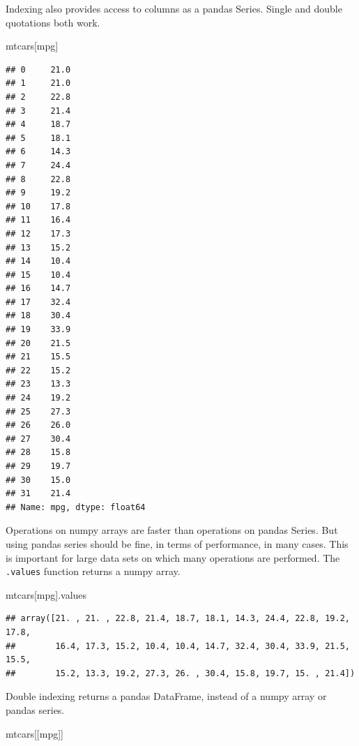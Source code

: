 \documentclass[
]{book}
\newenvironment{Shaded}{\begin{snugshade}}{\end{snugshade}}
\newcommand{\NormalTok}[1]{#1}
\newcommand{\StringTok}[1]{\textcolor[rgb]{0.31,0.60,0.02}{#1}}
\begin{document}
Indexing also provides access to columns as a pandas Series. Single and double quotations both work.

\begin{Shaded}
\begin{Highlighting}[]
\NormalTok{mtcars[}\StringTok{\textquotesingle{}mpg\textquotesingle{}}\NormalTok{]}
\end{Highlighting}
\end{Shaded}

\begin{verbatim}
## 0     21.0
## 1     21.0
## 2     22.8
## 3     21.4
## 4     18.7
## 5     18.1
## 6     14.3
## 7     24.4
## 8     22.8
## 9     19.2
## 10    17.8
## 11    16.4
## 12    17.3
## 13    15.2
## 14    10.4
## 15    10.4
## 16    14.7
## 17    32.4
## 18    30.4
## 19    33.9
## 20    21.5
## 21    15.5
## 22    15.2
## 23    13.3
## 24    19.2
## 25    27.3
## 26    26.0
## 27    30.4
## 28    15.8
## 29    19.7
## 30    15.0
## 31    21.4
## Name: mpg, dtype: float64
\end{verbatim}

Operations on numpy arrays are faster than operations on pandas Series. But using pandas series should be fine, in terms of performance, in many cases. This is important for large data sets on which many operations are performed. The \texttt{.values} function returns a numpy array.

\begin{Shaded}
\begin{Highlighting}[]
\NormalTok{mtcars[}\StringTok{\textquotesingle{}mpg\textquotesingle{}}\NormalTok{].values}
\end{Highlighting}
\end{Shaded}

\begin{verbatim}
## array([21. , 21. , 22.8, 21.4, 18.7, 18.1, 14.3, 24.4, 22.8, 19.2, 17.8,
##        16.4, 17.3, 15.2, 10.4, 10.4, 14.7, 32.4, 30.4, 33.9, 21.5, 15.5,
##        15.2, 13.3, 19.2, 27.3, 26. , 30.4, 15.8, 19.7, 15. , 21.4])
\end{verbatim}

Double indexing returns a pandas DataFrame, instead of a numpy array or pandas series.

\begin{Shaded}
\begin{Highlighting}[]
\NormalTok{mtcars[[}\StringTok{\textquotesingle{}mpg\textquotesingle{}}\NormalTok{]]}
\end{Highlighting}
\end{Shaded}
\end{document}
